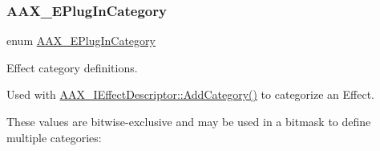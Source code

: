 \subsubsection{\texorpdfstring{AAX\_EPlugInCategory}{AAX\_EPlugInCategory}}
{\footnotesize\ttfamily enum \mbox{\hyperlink{a00491_aef9637518fb1ac0e2f403444c73aba4a}{A\+A\+X\+\_\+\+E\+Plug\+In\+Category}}}



Effect category definitions. 

Used with \mbox{\hyperlink{a01813_aeb6683e6758f7eb00f87c153e4809641}{A\+A\+X\+\_\+\+I\+Effect\+Descriptor\+::\+Add\+Category()}} to categorize an Effect.

These values are bitwise-\/exclusive and may be used in a bitmask to define multiple categories\+:


\begin{DoxyCode}{0}
\end{DoxyCode}


